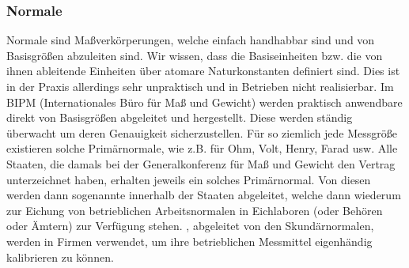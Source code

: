 \documentclass[letterpaper,10pt,english]{jupyterBook}
\begin{document}
\subsubsection{Normale}
\label{\detokenize{content/1_Messen_Einheit:normale}}
\sphinxAtStartPar


\sphinxAtStartPar
Normale sind Maßverkörperungen, welche einfach handhabbar sind und von Basisgrößen abzuleiten sind.
Wir wissen, dass die Basiseinheiten \sphinxhyphen{} bzw. die von ihnen ableitende Einheiten \sphinxhyphen{} über atomare Naturkonstanten definiert sind. Dies ist in der Praxis allerdings sehr unpraktisch und in Betrieben nicht realisierbar.
Im BIPM (Internationales Büro für Maß und Gewicht) werden praktisch anwendbare  direkt von Basisgrößen abgeleitet und hergestellt. Diese werden ständig überwacht um deren Genauigkeit sicherzustellen. Für so ziemlich jede Messgröße existieren solche Primärnormale, wie z.B. für Ohm, Volt, Henry, Farad usw.
Alle Staaten, die damals bei der Generalkonferenz für Maß und Gewicht den Vertrag unterzeichnet haben, erhalten jeweils ein solches Primärnormal. Von diesen werden dann sogenannte  innerhalb der Staaten abgeleitet, welche dann wiederum zur Eichung von betrieblichen Arbeitsnormalen in Eichlaboren (oder Behören oder Ämtern) zur Verfügung stehen.
, abgeleitet von den Skundärnormalen, werden in Firmen verwendet, um ihre betrieblichen Messmittel eigenhändig kalibrieren zu können.

\sphinxAtStartPar
{}

\sphinxstepscope
\end{document}
